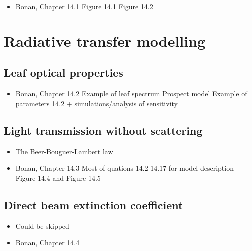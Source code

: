 \documentclass[
  oneside]{book}
\providecommand{\tightlist}{%
  \setlength{\itemsep}{0pt}\setlength{\parskip}{0pt}}
\begin{document}
\begin{itemize}
\tightlist
\item
  Bonan, Chapter 14.1
  Figure 14.1
  Figure 14.2
\end{itemize}

\hypertarget{radiative-transfer-modelling}{%
\section{Radiative transfer modelling}\label{radiative-transfer-modelling}}

\hypertarget{leaf-optical-properties}{%
\subsection{Leaf optical properties}\label{leaf-optical-properties}}

\begin{itemize}
\tightlist
\item
  Bonan, Chapter 14.2
  Example of leaf spectrum
  Prospect model
  Example of parameters 14.2 + simulations/analysis of sensitivity
\end{itemize}

\hypertarget{light-transmission-without-scattering}{%
\subsection{Light transmission without scattering}\label{light-transmission-without-scattering}}

\begin{itemize}
\tightlist
\item
  The Beer-Bouguer-Lambert law
\item
  Bonan, Chapter 14.3
  Most of quations 14.2-14.17 for model description
  Figure 14.4 and Figure 14.5
\end{itemize}

\hypertarget{direct-beam-extinction-coefficient}{%
\subsection{Direct beam extinction coefficient}\label{direct-beam-extinction-coefficient}}

\begin{itemize}
\tightlist
\item
  Could be skipped
\item
  Bonan, Chapter 14.4
\end{itemize}
\end{document}
